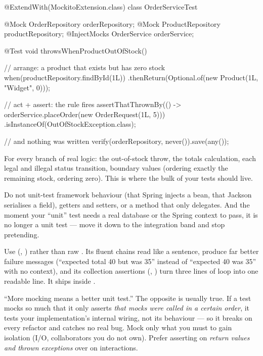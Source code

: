 \begin{javabox}
@ExtendWith(MockitoExtension.class)
class OrderServiceTest {

  @Mock  OrderRepository orderRepository;
  @Mock  ProductRepository productRepository;
  @InjectMocks OrderService orderService;

  @Test
  void throwsWhenProductOutOfStock() {
    // arrange: a product that exists but has zero stock
    when(productRepository.findById(1L))
        .thenReturn(Optional.of(new Product(1L, "Widget", 0)));

    // act + assert: the rule fires
    assertThatThrownBy(() ->
        orderService.placeOrder(new OrderRequest(1L, 5)))
      .isInstanceOf(OutOfStockException.class);

    // and nothing was written
    verify(orderRepository, never()).save(any());
  }
}
\end{javabox}

 For every branch of real logic: the out-of-stock throw, the totals calculation, each legal and illegal status transition, boundary values (ordering exactly the remaining stock, ordering zero). This is where the bulk of your tests should live.

 Do not unit-test framework behaviour (that Spring injects a bean, that Jackson serialises a field), getters and setters, or a method that only delegates. And the moment your ``unit'' test needs a real database or the Spring context to pass, it is no longer a unit test --- move it down to the integration band and stop pretending.

\begin{prodtip}
Use  (, ) rather than raw . Its fluent chains read like a sentence, produce far better failure messages (``expected total 40 but was 35'' instead of ``expected 40 was 35'' with no context), and its collection assertions (, ) turn three lines of loop into one readable line. It ships inside .
\end{prodtip}

\begin{misconception}
``More mocking means a better unit test.'' The opposite is usually true. If a test mocks so much that it only asserts \emph{that mocks were called in a certain order}, it tests your implementation's internal wiring, not its behaviour --- so it breaks on every refactor and catches no real bug. Mock only what you must to gain isolation (I/O, collaborators you do not own). Prefer asserting on \emph{return values and thrown exceptions} over  on interactions.
\end{misconception}


